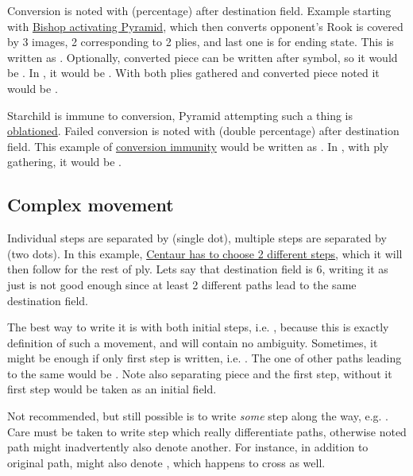 Conversion is noted with \alg{\%} (percentage) after destination field. Example starting
with \hyperref[fig:scn_ma_08_conversion_init]{Bishop activating Pyramid}, which then converts
opponent's Rook is covered by 3 images, 2 corresponding to 2 plies, and last one is for ending
state. This is written as . Optionally, converted piece can be written after
\alg{\%} symbol, so it would be . In , it would be
. With both plies gathered and converted piece noted it would be
\alg{[Bh9-d5]\~{}[Ad5-h5\%R]}.

Starchild is immune to conversion, Pyramid attempting such a thing is
\hyperref[sec:Terms/Oblation]{oblationed}. Failed conversion is noted with \alg{\%\%}
(double percentage) after destination field. This example of
\hyperref[fig:scn_o_14_starchild_conversion_immunity_init]{conversion immunity} would be
written as . In , with ply gathering, it would be
\alg{[Bs16-l23]\~{}[Al23-h23\%\%]}.

\subsection*{Complex movement}
\label{sec:Appendix/Notation/Complex movement}

Individual steps are separated by  (single dot), multiple steps are separated by
 (two dots). In this example,
\hyperref[fig:scn_hd_05_centaur_multi_step]{Centaur has to choose 2 different steps},
which it will then follow for the rest of ply. Lets say that destination field is 6,
writing it as just  is not good enough since at least 2 different paths lead
to the same destination field.

The best way to write it is with both initial steps, i.e. , because
this is exactly definition of such a movement, and will contain no ambiguity. Sometimes,
it might be enough if only first step is written, i.e. . The one of other
paths leading to the same  would be . Note also 
separating piece and the first step, without it first step would be taken as an initial
field.

Not recommended, but still possible is to write \emph{some} step along the way, e.g.
. Care must be taken to write step which really differentiate paths,
otherwise noted path might inadvertently also denote another. For instance, in addition
to original path,  might also denote , which happens
to cross  as well.

